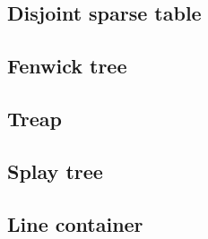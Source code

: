 \subsection{Disjoint sparse table}

\subsection{Fenwick tree}

\subsection{Treap}

\subsection{Splay tree}

\subsection{Line container}
